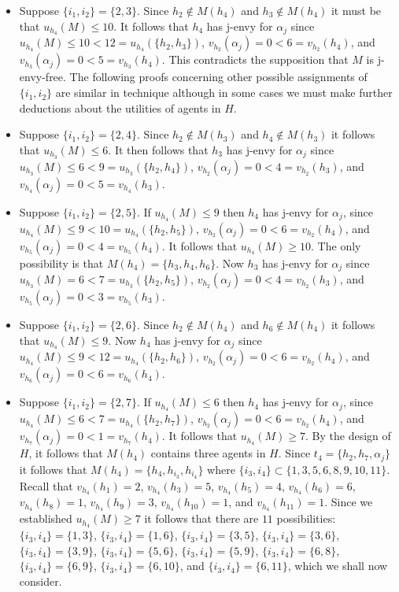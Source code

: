 \begin{itemize}
    \item Suppose $\{ {i_1}, {i_2} \} = \{ 2, 3 \}$. Since $h_2 \notin M(h_4)$ and $h_3 \notin M(h_4)$ it must be that $u_{h_4}(M) \leq 10$. It follows that $h_4$ has j-envy for $\alpha_{j}$ since $u_{h_4}(M) \leq 10 < 12 = u_{h_4}(\{ h_2, h_3 \})$, $v_{h_2}(\alpha_{j}) = 0 < 6 = v_{h_2}(h_4)$, and $v_{h_3}(\alpha_{j}) = 0 < 5 = v_{h_3}(h_4)$. This contradicts the supposition that $M$ is j-envy-free. The following proofs concerning other possible assignments of $\{ {i_1}, {i_2} \}$ are similar in technique although in some cases we must make further deductions about the utilities of agents in $H$.
    \item Suppose $\{ {i_1}, {i_2} \} = \{ 2, 4 \}$. Since $h_2 \notin M(h_3)$ and $h_4 \notin M(h_3)$ it follows that $u_{h_3}(M) \leq 6$. It then follows that $h_3$ has j-envy for $\alpha_{j}$ since $u_{h_3}(M) \leq 6 < 9 = u_{h_3}(\{ h_2, h_4 \})$, $v_{h_2}(\alpha_{j}) = 0 < 4 = v_{h_2}(h_3)$, and $v_{h_4}(\alpha_{j}) = 0 < 5 = v_{h_4}(h_3)$.
    \item Suppose $\{ {i_1}, {i_2} \} = \{ 2, 5 \}$. If $u_{h_4}(M) \leq 9$ then $h_4$ has j-envy for $\alpha_{j}$, since $u_{h_4}(M) \leq 9 < 10 = u_{h_4}(\{ h_2, h_5 \})$, $v_{h_2}(\alpha_{j}) = 0 < 6 = v_{h_2}(h_4)$, and $v_{h_5}(\alpha_{j}) = 0 < 4 = v_{h_5}(h_4)$. It follows that $u_{h_4}(M) \geq 10$. The only possibility is that $M(h_4) = \{ h_3, h_4, h_6 \}$. Now $h_3$ has j-envy for $\alpha_{j}$ since $u_{h_3}(M) = 6 < 7 = u_{h_3}(\{ h_2, h_5 \})$, $v_{h_2}(\alpha_{j}) = 0 < 4 = v_{h_2}(h_3)$, and $v_{h_5}(\alpha_{j}) = 0 < 3 = v_{h_5}(h_3)$.
    \item Suppose $\{ {i_1}, {i_2} \} = \{ 2, 6 \}$. Since $h_2 \notin M(h_4)$ and $h_6 \notin M(h_4)$ it follows that $u_{h_4}(M) \leq 9$. Now $h_4$ has j-envy for $\alpha_{j}$ since $u_{h_4}(M) \leq 9 < 12 = u_{h_4}(\{ h_2, h_6 \})$, $v_{h_2}(\alpha_{j}) = 0 < 6 = v_{h_2}(h_4)$, and $v_{h_6}(\alpha_{j}) = 0 < 6 = v_{h_6}(h_4)$.
    \item Suppose $\{ {i_1}, {i_2} \} = \{ 2, 7 \}$. If $u_{h_4}(M) \leq 6$ then $h_4$ has j-envy for $\alpha_{j}$, since $u_{h_4}(M) \leq 6 < 7 = u_{h_4}(\{ h_2, h_7 \})$, $v_{h_2}(\alpha_{j}) = 0 < 6 = v_{h_2}(h_4)$, and $v_{h_7}(\alpha_{j}) = 0 < 1 = v_{h_7}(h_4)$. It follows that $u_{h_4}(M) \geq 7$. By the design of $H$, it follows that $M(h_4)$ contains three agents in $H$. Since $t_4 = \{ h_2, h_7, \alpha_{j} \}$ it follows that $M(h_4) = \{ h_4, h_{i_3}, h_{i_4} \}$ where $\{ i_3, i_4 \} \subset \{ 1, 3, 5, 6, 8, 9, 10, 11 \}$. Recall that $v_{h_4}(h_1) = 2$, $v_{h_4}(h_3) = 5$, $v_{h_4}(h_5) = 4$, $v_{h_4}(h_6) = 6$, $v_{h_4}(h_8) = 1$, $v_{h_4}(h_9) = 3$, $v_{h_4}(h_{10}) = 1$, and $v_{h_4}(h_{11}) = 1$. Since we established $u_{h_4}(M) \geq 7$ it follows that there are $11$ possibilities: $\{ {i_3}, {i_4} \} = \{ 1, 3 \}$, $\{ {i_3}, {i_4} \} = \{ 1, 6 \}$, $\{ {i_3}, {i_4} \} = \{ 3, 5 \}$, $\{ {i_3}, {i_4} \} = \{ 3, 6 \}$, $\{ {i_3}, {i_4} \} = \{ 3, 9 \}$, $\{ {i_3}, {i_4} \} = \{ 5, 6 \}$, $\{ {i_3}, {i_4} \} = \{ 5, 9 \}$, $\{ {i_3}, {i_4} \} = \{ 6, 8 \}$, $\{ {i_3}, {i_4} \} = \{ 6, 9 \}$, $\{ {i_3}, {i_4} \} = \{ 6, 10 \}$, and $\{ {i_3}, {i_4} \} = \{ 6, 11 \}$, which we shall now consider.

\end{itemize}
